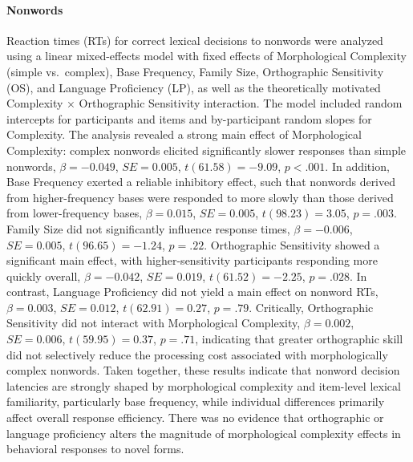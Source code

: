 \documentclass[preprint,12pt, authoryear, review]{elsarticle}
\begin{document}
	\paragraph*{Nonwords}
	Reaction times (RTs) for correct lexical decisions to nonwords were analyzed using a linear mixed-effects model with fixed effects of Morphological Complexity (simple vs.\ complex), Base Frequency, Family Size, Orthographic Sensitivity (OS), and Language Proficiency (LP), as well as the theoretically motivated Complexity × Orthographic Sensitivity interaction. The model included random intercepts for participants and items and by-participant random slopes for Complexity. The analysis revealed a strong main effect of Morphological Complexity: complex nonwords elicited significantly slower responses than simple nonwords, $\beta = -0.049$, $SE = 0.005$, $t(61.58) = -9.09$, $p < .001$. In addition, Base Frequency exerted a reliable inhibitory effect, such that nonwords derived from higher-frequency bases were responded to more slowly than those derived from lower-frequency bases, $\beta = 0.015$, $SE = 0.005$, $t(98.23) = 3.05$, $p = .003$. Family Size did not significantly influence response times, $\beta = -0.006$, $SE = 0.005$, $t(96.65) = -1.24$, $p = .22$. Orthographic Sensitivity showed a significant main effect, with higher-sensitivity participants responding more quickly overall, $\beta = -0.042$, $SE = 0.019$, $t(61.52) = -2.25$, $p = .028$. In contrast, Language Proficiency did not yield a main effect on nonword RTs, $\beta = 0.003$, $SE = 0.012$, $t(62.91) = 0.27$, $p = .79$. Critically, Orthographic Sensitivity did not interact with Morphological Complexity, $\beta = 0.002$, $SE = 0.006$, $t(59.95) = 0.37$, $p = .71$, indicating that greater orthographic skill did not selectively reduce the processing cost associated with morphologically complex nonwords. Taken together, these results indicate that nonword decision latencies are strongly shaped by morphological complexity and item-level lexical familiarity, particularly base frequency, while individual differences primarily affect overall response efficiency. There was no evidence that orthographic or language proficiency alters the magnitude of morphological complexity effects in behavioral responses to novel forms.
\end{document}
